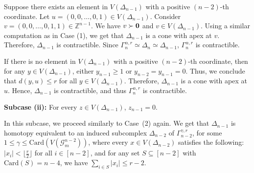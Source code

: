 \documentclass{amsart}
\theoremstyle{definition}
\theoremstyle{remark}
\numberwithin{equation}{section}
\newcommand{\D}{\Delta}
\newcommand{\f}{\lfloor\frac{r}{2}\rfloor}
\def\Z{{\mathbb{Z}}}
\begin{document}
Suppose there exists an element in $V(\Delta_{n-1})$ with a positive $(n-2)$-th coordinate. Let $u =  (0,0,\ldots,0, 1) \in V(\Delta_{n-1})$. Consider $v = (0,0,\ldots,0,1,1) \in \Z^{n-1}$. We have $v \succ {\bf{0}}$ and $v \in V(\Delta_{n-1})$.  Using a similar computation as in Case (1), we get that $\D_{n-1}$ is a cone with apex at $v$. Therefore, $\D_{n-1}$ is contractible. Since $\Gamma_n^{\alpha, r}\simeq \D_n\simeq \D_{n-1}$, $\Gamma_n^{\alpha, r}$ is contractible.





If there is no element in $V(\Delta_{n-1})$ with a positive $(n-2)$-th coordinate, then for any $y \in V(\Delta_{n-1})$, either $y_{n-1}  \geq 1$ or $y_{n-2} = y_{n-1} = 0$. Thus, we conclude that $d(y,u) \leq r$ for all $y \in V(\Delta_{n-1})$. Therefore, $\Delta_{n-1}$ is a cone with apex at $u$. Hence, $\Delta_{n-1}$ is contractible, and thus $\Gamma_n^{\alpha, r}$ is contractible.





    \smallskip
	\noindent 
\textbf{Subcase (ii):} For every $z \in V(\Delta_{n-1})$, $z_{n-1} = 0$.

In this subcase, we proceed similarly to  Case~(2) again. We get that $\Delta_{n-1}$ is homotopy equivalent to an induced subcomplex $\Delta_{n-2}$ of $\Gamma_{n-2}^{\gamma,r}$, for some $1 \leq \gamma \leq \text{Card}(V(\mathcal{G}_m^{n-2}))$, where every $x \in V(\Delta_{n-2})$ satisfies the following: $|x_i| < \f$ for all $i \in [n-2]$, and for any set $S \subseteq [n-2]$ with $\text{Card}(S) = n-4$, we have $\sum_{i \in S} |x_i| \leq r-2$.
\end{document}
